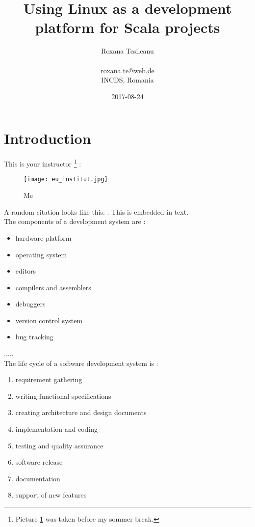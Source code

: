 \documentclass{article}
\title{Using Linux as a development platform for Scala projects}
\date{2017-08-24}
\author{Roxana Tesileanu \\ 
\\ 
roxana.te@web.de \\
INCDS, Romania }
\begin{document}
	\maketitle
	\newpage

\tableofcontents
\newpage

\section{Introduction}

This is your instructor \footnote{\label{footnote1}Picture \ref{fig: Roxi} was taken before my sommer break.} : 
\\
\begin{figure} [H]
 \texttt{[image: eu\_institut.jpg]}
 \caption{Me}
 \label{fig: Roxi}
\end{figure}


\newpage
A random citation looks like this:
\cite{odersky_programming_2010}. This is embedded in text. \\

The components of a development system are \cite{rehman_linux_2003}:
\begin{itemize}
\item  hardware platform 
\item  operating system 
\item  editors 
\item  compilers and assemblers 
\item  debuggers 
\item  version control system 
\item  bug tracking 
\end{itemize}

..... \\

The life cycle of a software development system is \cite{rehman_linux_2003}:\newline
\begin{enumerate}
\item requirement gathering
\item writing functional specifications
\item creating architecture and design documents
\item implementation and coding
\item testing and quality assurance
\item software release
\item documentation
\item support of new features
\end{enumerate}
\end{document}
